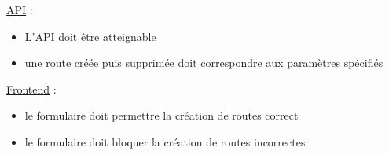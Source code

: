 \underline{API} :
\begin{itemize}
\item L'API doit être atteignable
\item une route créée puis supprimée doit correspondre aux paramètres spécifiés\newline
\end{itemize}

\underline{Frontend} :
\begin{itemize}
\item le formulaire doit permettre la création de routes correct
\item le formulaire doit bloquer la création de routes incorrectes
\end{itemize}

